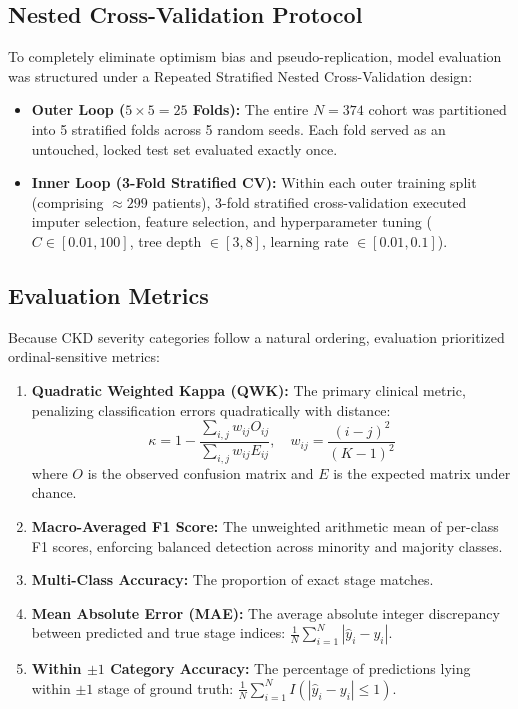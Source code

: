 \documentclass[conference]{IEEEtran}
\begin{document}
\subsection{Nested Cross-Validation Protocol}
To completely eliminate optimism bias and pseudo-replication, model evaluation was structured under a Repeated Stratified Nested Cross-Validation design:
\begin{itemize}
    \item \textbf{Outer Loop ($5 \times 5 = 25$ Folds):} The entire $N = 374$ cohort was partitioned into 5 stratified folds across 5 random seeds. Each fold served as an untouched, locked test set evaluated exactly once.
    \item \textbf{Inner Loop (3-Fold Stratified CV):} Within each outer training split (comprising $\approx 299$ patients), 3-fold stratified cross-validation executed imputer selection, feature selection, and hyperparameter tuning ($C \in [0.01, 100]$, tree depth $\in [3, 8]$, learning rate $\in [0.01, 0.1]$).
\end{itemize}

\subsection{Evaluation Metrics}
Because CKD severity categories follow a natural ordering, evaluation prioritized ordinal-sensitive metrics:
\begin{enumerate}
    \item \textbf{Quadratic Weighted Kappa (QWK):} The primary clinical metric, penalizing classification errors quadratically with distance:
    \begin{equation}
    \kappa = 1 - \frac{\sum_{i,j} w_{ij} O_{ij}}{\sum_{i,j} w_{ij} E_{ij}}, \quad w_{ij} = \frac{(i - j)^2}{(K - 1)^2}
    \end{equation}
    where $O$ is the observed confusion matrix and $E$ is the expected matrix under chance.
    \item \textbf{Macro-Averaged F1 Score:} The unweighted arithmetic mean of per-class F1 scores, enforcing balanced detection across minority and majority classes.
    \item \textbf{Multi-Class Accuracy:} The proportion of exact stage matches.
    \item \textbf{Mean Absolute Error (MAE):} The average absolute integer discrepancy between predicted and true stage indices: $\frac{1}{N} \sum_{i=1}^N |\hat{y}_i - y_i|$.
    \item \textbf{Within $\pm 1$ Category Accuracy:} The percentage of predictions lying within $\pm 1$ stage of ground truth: $\frac{1}{N} \sum_{i=1}^N I(|\hat{y}_i - y_i| \le 1)$.
\end{enumerate}
\end{document}
